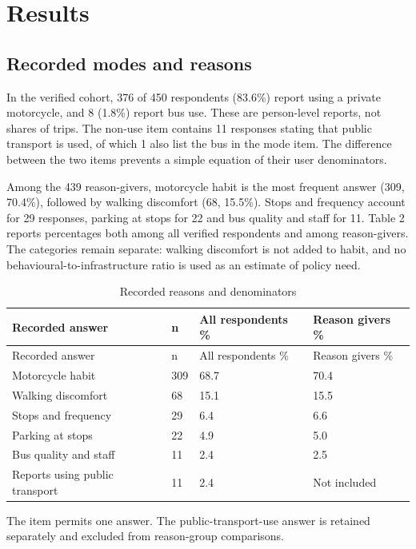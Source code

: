 \documentclass[
  11pt,
  a4paper,
]{article}
\begin{document}
\section{Results}\label{results}

\subsection{Recorded modes and
reasons}\label{recorded-modes-and-reasons}

In the verified cohort, 376 of 450 respondents (83.6\%) report using a
private motorcycle, and 8 (1.8\%) report bus use. These are person-level
reports, not shares of trips. The non-use item contains 11 responses
stating that public transport is used, of which 1 also list the bus in
the mode item. The difference between the two items prevents a simple
equation of their user denominators.

Among the 439 reason-givers, motorcycle habit is the most frequent
answer (309, 70.4\%), followed by walking discomfort (68, 15.5\%). Stops
and frequency account for 29 responses, parking at stops for 22 and bus
quality and staff for 11. Table 2 reports percentages both among all
verified respondents and among reason-givers. The categories remain
separate: walking discomfort is not added to habit, and no
behavioural-to-infrastructure ratio is used as an estimate of policy
need.

\begin{longtable}[]{@{}llll@{}}
\caption{Recorded reasons and denominators}\tabularnewline
\toprule\noalign{}
Recorded answer & n & All respondents \% & Reason givers \% \\
\midrule\noalign{}
\endfirsthead
\toprule\noalign{}
Recorded answer & n & All respondents \% & Reason givers \% \\
\midrule\noalign{}
\endhead
\bottomrule\noalign{}
\endlastfoot
Motorcycle habit & 309 & 68.7 & 70.4 \\
Walking discomfort & 68 & 15.1 & 15.5 \\
Stops and frequency & 29 & 6.4 & 6.6 \\
Parking at stops & 22 & 4.9 & 5.0 \\
Bus quality and staff & 11 & 2.4 & 2.5 \\
Reports using public transport & 11 & 2.4 & Not included \\
\end{longtable}

The item permits one answer. The public-transport-use answer is retained
separately and excluded from reason-group comparisons.
\end{document}
